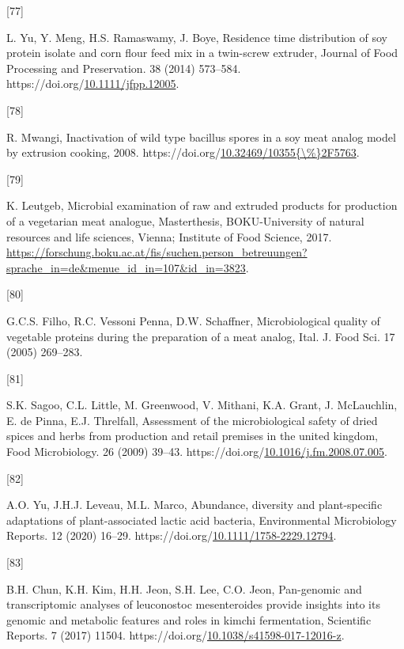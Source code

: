\documentclass[preprint,3p,
a4paper]{elsarticle} %
\newlength{\cslhangindent}
\newlength{\csllabelwidth}
\newlength{\cslentryspacingunit} %
\newenvironment{CSLReferences}[2] %
 {%
  \setlength{\parindent}{0pt}
  \ifodd #1
  \let\oldpar\par
  \def\par{\hangindent=\cslhangindent\oldpar}
  \fi
  \setlength{\parskip}{#2\cslentryspacingunit}
 }%
 {}
\newcommand{\CSLLeftMargin}[1]{\parbox[t]{\csllabelwidth}{#1}}
\newcommand{\CSLRightInline}[1]{\parbox[t]{\linewidth - \csllabelwidth}{#1}\break}
\begin{document}
\begin{CSLReferences}{0}{0}
\leavevmode{}%
\CSLLeftMargin{{[}77{]} }%
\CSLRightInline{L. Yu, Y. Meng, H.S. Ramaswamy, J. Boye, Residence time
distribution of soy protein isolate and corn flour feed mix in a
twin-screw extruder, Journal of Food Processing and Preservation. 38
(2014) 573--584.
https://doi.org/\href{https://doi.org/10.1111/jfpp.12005}{10.1111/jfpp.12005}.}

\leavevmode{}%
\CSLLeftMargin{{[}78{]} }%
\CSLRightInline{R. Mwangi, Inactivation of wild type bacillus spores in
a soy meat analog model by extrusion cooking, 2008.
https://doi.org/\href{https://doi.org/10.32469/10355\%7B/\%\%7D2F5763}{10.32469/10355\{\textbackslash\%\}2F5763}.}

\leavevmode{}%
\CSLLeftMargin{{[}79{]} }%
\CSLRightInline{K. Leutgeb, Microbial examination of raw and extruded
products for production of a vegetarian meat analogue, Masterthesis,
{BOKU-University of natural resources and life sciences, Vienna};
Institute of Food Science, 2017.
\url{https://forschung.boku.ac.at/fis/suchen.person_betreuungen?sprache_in=de\&menue_id_in=107\&id_in=3823}.}

\leavevmode{}%
\CSLLeftMargin{{[}80{]} }%
\CSLRightInline{G.C.S. Filho, R.C. Vessoni Penna, D.W. Schaffner,
Microbiological quality of vegetable proteins during the preparation of
a meat analog, Ital. J. Food Sci. 17 (2005) 269--283.}

\leavevmode{}%
\CSLLeftMargin{{[}81{]} }%
\CSLRightInline{S.K. Sagoo, C.L. Little, M. Greenwood, V. Mithani, K.A.
Grant, J. McLauchlin, E. de Pinna, E.J. Threlfall, Assessment of the
microbiological safety of dried spices and herbs from production and
retail premises in the united kingdom, Food Microbiology. 26 (2009)
39--43.
https://doi.org/\href{https://doi.org/10.1016/j.fm.2008.07.005}{10.1016/j.fm.2008.07.005}.}

\leavevmode{}%
\CSLLeftMargin{{[}82{]} }%
\CSLRightInline{A.O. Yu, J.H.J. Leveau, M.L. Marco, Abundance, diversity
and plant-specific adaptations of plant-associated lactic acid bacteria,
Environmental Microbiology Reports. 12 (2020) 16--29.
https://doi.org/\href{https://doi.org/10.1111/1758-2229.12794}{10.1111/1758-2229.12794}.}

\leavevmode{}%
\CSLLeftMargin{{[}83{]} }%
\CSLRightInline{B.H. Chun, K.H. Kim, H.H. Jeon, S.H. Lee, C.O. Jeon,
Pan-genomic and transcriptomic analyses of leuconostoc mesenteroides
provide insights into its genomic and metabolic features and roles in
kimchi fermentation, Scientific Reports. 7 (2017) 11504.
https://doi.org/\href{https://doi.org/10.1038/s41598-017-12016-z}{10.1038/s41598-017-12016-z}.}


\end{CSLReferences}
\end{document}
